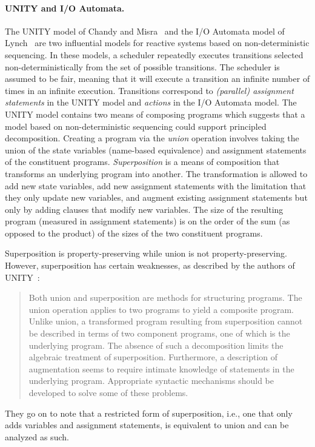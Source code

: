 \paragraph{UNITY and I/O Automata.}
The UNITY model of Chandy and Misra~\cite{chandy1989parallel} and the I/O Automata model of Lynch~\cite{nancy1996distributed} are two influential models for reactive systems based on non-deterministic sequencing.
In these models, a scheduler repeatedly executes transitions selected non-deterministically from the set of possible transitions.
The scheduler is assumed to be fair, meaning that it will execute a transition an infinite number of times in an infinite execution.
Transitions correspond to \emph{(parallel) assignment statements} in the UNITY model and \emph{actions} in the I/O Automata model.
The UNITY model contains two means of composing programs which suggests that a model based on non-deterministic sequencing could support principled decomposition.
Creating a program via the \emph{union} operation involves taking the union of the state variables (name-based equivalence) and assignment statements of the constituent programs.
\emph{Superposition} is a means of composition that transforms an underlying program into another.
The transformation is allowed to add new state variables, add new assignment statements with the limitation that they only update new variables, and augment existing assignment statements but only by adding clauses that modify new variables.
The size of the resulting program (measured in assignment statements) is on the order of the sum (as opposed to the product) of the sizes of the two constituent programs.

Superposition is property-preserving while union is not property-preserving.
However, superposition has certain weaknesses, as described by the authors of UNITY~\cite{chandy1989parallel}:
\begin{quotation}
Both union and superposition are methods for structuring programs.
The union operation applies to two programs to yield a composite program.
Unlike union, a transformed program resulting from superposition cannot be described in terms of two component programs, one of which is the underlying program.
The absence of such a decomposition limits the algebraic treatment of superposition.
Furthermore, a description of augmentation seems to require intimate knowledge of statements in the underlying program.
Appropriate syntactic mechanisms should be developed to solve some of these problems.
\end{quotation}
They go on to note that a restricted form of superposition, i.e., one that only adds variables and assignment statements, is equivalent to union and can be analyzed as such.

